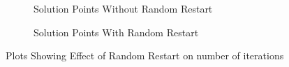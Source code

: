\begin{figure}[!ht] %
	\centering
	\begin{subfigure}[b]{0.4\textwidth}
	\caption{Solution Points Without Random Restart}  
	\label{fig:20a}
	\end{subfigure}	
	\begin{subfigure}[b]{0.4\textwidth}
		\caption{Solution Points With Random Restart}  
		\label{fig:20b}
	\end{subfigure}	
\caption{Plots Showing Effect of Random Restart on number of iterations}
\label{fig:20}
\end{figure}

